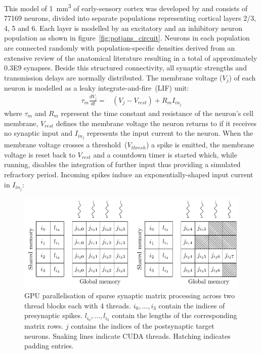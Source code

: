 \documentclass[utf8]{frontiersSCNS} %
\begin{document}
This model of \SI{1}{\milli\metre\cubed} of early-sensory cortex was developed by \citet{Potjans2012} and consists of \num{77169} neurons, divided into separate populations representing cortical layers 2/3, 4, 5 and 6.
Each layer is modelled by an excitatory and an inhibitory neuron population as shown in figure~\ref{fig:potjans_circuit}.
Neurons in each population are connected randomly with population-specific densities derived from an extensive review of the anatomical literature resulting in a total of approximately \num{0.3E9} synapses.
Beside this structured connectivity, all synaptic strengths and transmission delays are normally distributed.
The membrane voltage ($V_{j}$) of each neuron is modelled as a leaky integrate-and-fire~(LIF) unit:
%
\begin{align}
    \tau_{m} \frac{dV_{j}}{dt} = & (V_{j} - V_{rest}) + R_{m} I_{{in}_{j}} \label{eq:lif_neuron}
\end{align}
%
where $\tau_{m}$ and $R_{m}$ represent the time constant and resistance of the neuron's cell membrane, $V_{rest}$ defines the membrane voltage the neuron returns to if it receives no synaptic input and $I_{{in}_{j}}$ represents the input current to the neuron.
When the membrane voltage crosses a threshold~($V_{thresh}$) a spike is emitted, the membrane voltage is reset back to $V_{rest}$ and a countdown timer is started which, while running, disables the integration of further input thus providing a simulated refractory period.
Incoming spikes induce an exponentially-shaped input current in $I_{{in}_{j}}$:

\begin{figure}
    \begin{center}
        \includegraphics{figures/ragged_matrix}
    \end{center}
    \caption{GPU parallelisation of sparse synaptic matrix processing across two thread blocks each with \num{4} threads.
    $i_{0},\ldots,i_{3}$ contain the indices of presynaptic spikes.
    $l_{i_{0}},\ldots,l_{i_{3}}$ contain the lengths of the corresponding matrix rows.
    $j$ contains the indices of the postsynaptic target neurons.
    Snaking lines indicate CUDA threads.
    Hatching indicates padding entries.}
    \label{fig:ragged_matrix}
\end{figure}
\end{document}
